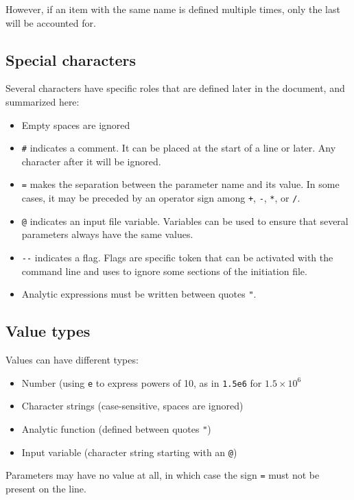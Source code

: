 \documentclass[10pt]{article}
\begin{document}
However, if an item with the same name is defined multiple times, only the last will be accounted for.




\subsection{Special characters}

Several characters have specific roles that are defined later in the document, and summarized here:

\begin{itemize}
	\item Empty spaces are ignored
	\item \verb+#+ indicates a comment. It can be placed at the start of a line or later.
Any character after it will be ignored.
	\item \verb+=+ makes the separation between the parameter name and its value.
In some cases, it may be preceded by an operator sign among \verb-+-, \verb+-+, \verb+*+, or \verb+/+.
	\item \verb+@+ indicates an input file variable.
Variables can be used to ensure that several parameters always have the same values.
	\item \verb+--+ indicates a flag.
Flags are specific token that can be activated with the command line and uses to ignore some sections of the initiation file.
	\item Analytic expressions must be written between quotes \verb+"+.
\end{itemize}

\subsection{Value types}

Values can have different types:

\begin{itemize}
	\item Number (using \verb+e+ to express powers of 10, as in \verb+1.5e6+ for $1.5 \times 10^6$
	\item Character strings (case-sensitive, spaces are ignored)
	\item Analytic function (defined between quotes \verb+"+)
	\item Input variable (character string starting with an \verb+@+)
\end{itemize}

Parameters may have no value at all, in which case the sign \verb+=+ must not be present on the line.
\end{document}
